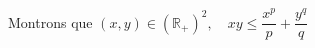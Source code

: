 \documentclass[preview]{standalone}
\begin{document}
\begin{center}
Montrons que \((x, y)\in (\mathbb{R}_{+})^2,\quad xy\leqslant \dfrac{x^p}{p} + \dfrac{y^q}{q}\)
\end{center}
\end{document}
